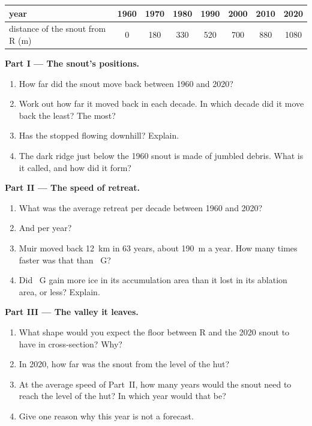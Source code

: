 \begin{problem}
\begin{center}
\smallskip
{\small
\begin{tabular}{|l|c|c|c|c|c|c|c|}
\hline
year & 1960 & 1970 & 1980 & 1990 & 2000 & 2010 & 2020 \\
\hline
distance of the snout from R (m) & 0 & 180 & 330 & 520 & 700 & 880 & 1080 \\
\hline
\end{tabular}}
\end{center}

\noindent\textbf{Part I --- The snout's positions.}\par\nopagebreak
\begin{enumerate}[beginpenalty=10000]
  \item How far did the snout move back between 1960 and 2020?
  \item Work out how far it moved back in each decade. In which decade
        did it move back the least? The most?
  \item Has the  stopped flowing downhill? Explain.
  \item The dark ridge just below the 1960 snout is made of jumbled 
        debris. What is it called, and how did it form?
\end{enumerate}

\noindent\textbf{Part II --- The speed of retreat.}\par\nopagebreak
\begin{enumerate}[resume, beginpenalty=10000]
  \item What was the average retreat per decade between 1960 and 2020?
  \item And per year?
  \item Muir  moved back \qty{12}{km} in 63 years, about
        \qty{190}{m} a year. How many times faster was that than
        ~G?
  \item Did ~G gain more ice in its accumulation area than it lost
        in its ablation area, or less? Explain.
\end{enumerate}

\noindent\textbf{Part III --- The valley it leaves.}\par\nopagebreak
\begin{enumerate}[resume, beginpenalty=10000]
  \item What shape would you expect the  floor between R and the
        2020 snout to have in cross-section? Why?
  \item In 2020, how far was the snout from the level of the hut?
  \item At the average speed of Part~II, how many years would the snout
        need to reach the level of the hut? In which year would that be?
  \item Give one reason why this year is not a forecast.
\end{enumerate}
\end{problem}
